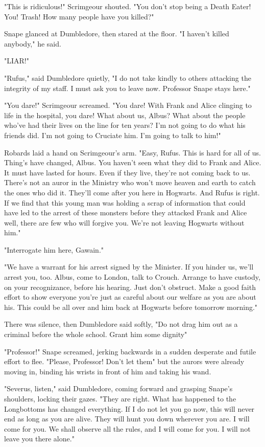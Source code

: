 "This is ridiculous!" Scrimgeour shouted. "You don't stop being a Death Eater! You! Trash! How many people have you killed?"

Snape glanced at Dumbledore, then stared at the floor. "I haven't killed anybody," he said.

"LIAR!"

"Rufus," said Dumbledore quietly, "I do not take kindly to others attacking the integrity of my staff. I must ask you to leave now. Professor Snape stays here."

"You dare!" Scrimgeour screamed. "You dare! With Frank and Alice clinging to life in the hospital, you dare! What about us, Albus? What about the people who've had their lives on the line for ten years? I'm not going to do what his friends did. I'm not going to Cruciate him. I'm going to talk to him!"

Robards laid a hand on Scrimgeour's arm. "Easy, Rufus. This is hard for all of us. Thing's have changed, Albus. You haven't seen what they did to Frank and Alice. It must have lasted for hours. Even if they live, they're not coming back to us. There's not an auror in the Ministry who won't move heaven and earth to catch the ones who did it. They'll come after you here in Hogwarts. And Rufus is right. If we find that this young man was holding a scrap of information that could have led to the arrest of these monsters before they attacked Frank and Alice{\el} well, there are few who will forgive you. We're not leaving Hogwarts without him."

"Interrogate him here, Gawain."

"We have a warrant for his arrest signed by the Minister. If you hinder us, we'll arrest you, too. Albus, come to London, talk to Crouch. Arrange to have custody, on your recognizance, before his hearing. Just don't obstruct. Make a good faith effort to show everyone you're just as careful about our welfare as you are about his. This could be all over and him back at Hogwarts before tomorrow morning."

There was silence, then Dumbledore said softly, "Do not drag him out as a criminal before the whole school. Grant him some dignity{\el}"

"Professor!" Snape screamed, jerking backwards in a sudden desperate and futile effort to flee. "Please, Professor! Don't let them{\el}" but the aurors were already moving in, binding his wrists in front of him and taking his wand.

"Severus, listen," said Dumbledore, coming forward and grasping Snape's shoulders, locking their gazes. "They are right. What has happened to the Longbottoms has changed everything. If I do not let you go now, this will never end as long as you are alive. They will hunt you down wherever you are. I will come for you. We shall observe all the rules, and I will come for you. I will not leave you there alone."

